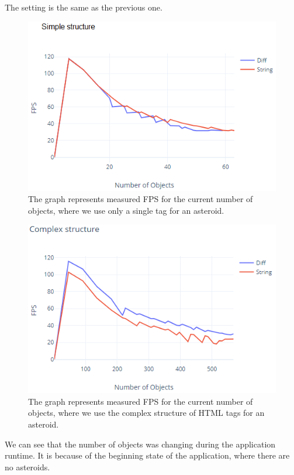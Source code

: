 The setting is the same as the previous one.
\par
\begin{figure}
\centering
\includegraphics{./img/graph_1}
\caption{The graph represents measured FPS for the current number of objects, where we use only a single tag for an asteroid.}
\label{img31:benchmark1}
\end{figure} 
\par
\begin{figure}
\centering
\includegraphics{./img/graph_3}
\caption{The graph represents measured FPS for the current number of objects, where we use the complex structure of HTML tags for an asteroid.}
\label{img32:benchmark2}
\end{figure} 
\par
We can see that the number of objects was changing during the application runtime.
It is because of the beginning state of the application, where there are no asteroids.
